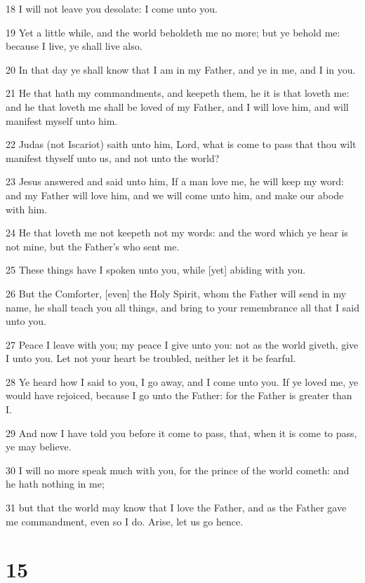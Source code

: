\par 18 I will not leave you desolate: I come unto you.
\par 19 Yet a little while, and the world beholdeth me no more; but ye behold me: because I live, ye shall live also.
\par 20 In that day ye shall know that I am in my Father, and ye in me, and I in you.
\par 21 He that hath my commandments, and keepeth them, he it is that loveth me: and he that loveth me shall be loved of my Father, and I will love him, and will manifest myself unto him.
\par 22 Judas (not Iscariot) saith unto him, Lord, what is come to pass that thou wilt manifest thyself unto us, and not unto the world?
\par 23 Jesus answered and said unto him, If a man love me, he will keep my word: and my Father will love him, and we will come unto him, and make our abode with him.
\par 24 He that loveth me not keepeth not my words: and the word which ye hear is not mine, but the Father's who sent me.
\par 25 These things have I spoken unto you, while [yet] abiding with you.
\par 26 But the Comforter, [even] the Holy Spirit, whom the Father will send in my name, he shall teach you all things, and bring to your remembrance all that I said unto you.
\par 27 Peace I leave with you; my peace I give unto you: not as the world giveth, give I unto you. Let not your heart be troubled, neither let it be fearful.
\par 28 Ye heard how I said to you, I go away, and I come unto you. If ye loved me, ye would have rejoiced, because I go unto the Father: for the Father is greater than I.
\par 29 And now I have told you before it come to pass, that, when it is come to pass, ye may believe.
\par 30 I will no more speak much with you, for the prince of the world cometh: and he hath nothing in me;
\par 31 but that the world may know that I love the Father, and as the Father gave me commandment, even so I do. Arise, let us go hence.

\chapter{15}

